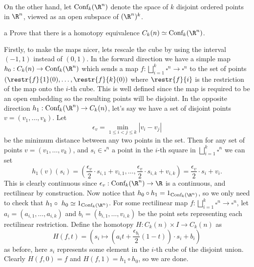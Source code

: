 \documentclass[11pt,letterpaper]{article}
\begin{document}
\begin{solution}
    \quad On the other hand, let $\text{Conf}_k(\R^n)$ denote the space of $k$ disjoint ordered points in $\R^n$, viewed as an open subspace of $(\R^n)^k$.

    \begin{partproblem}{a}
        Prove that there is a homotopy equivalence $C_k(n)\simeq \text{Conf}_k(\R^n)$.
    \end{partproblem}

    \quad Firstly, to make the maps nicer, lets rescale the cube by using the interval $(-1,1)$ instead of $(0,1)$. In the forward direction we have a simple map $h_0 : C_k(n) \to \text{Conf}_k(\R^n)$ which sends a map $f : \bigsqcup_{i=1}^k \square^n \to \square^n$ to the set of points $(\restr{f}{1}(0), \ldots, \restr{f}{k}(0))$ where $\restr{f}{i}$ is the restriction of the map onto the $i$-th cube. This is well defined since the map is required to be an open embedding so the resulting points will be disjoint. In the opposite direction $h_1 : \text{Conf}_k(\R^n) \to C_k(n)$, let's say we have a set of disjoint points $v=(v_1,\ldots,v_k)$. Let $$\epsilon_v = \min_{1\leq i< j\leq k} |v_i - v_j|$$ be the minimum distance between any two points in the set. Then for any set of points $v=(v_1, \ldots, v_k)$, and $s_i\in \square^n$ a point in the $i$-th square in $\bigsqcup^k_{i=1}\square^n$ we can set
    \[
        h_1(v)(s_i) = \left(\frac{\epsilon_v}{2}\cdot s_{i,1} + v_{i,1}, \ldots, \frac{\epsilon_v}{2}\cdot s_{i,k} + v_{i,k}\right) = \frac{\epsilon_v}{2}\cdot s_i + v_i
    .\]
    This is clearly continuous since $\epsilon_v : \text{Conf}_k(\R^n) \to \R$ is a continuous, and rectilinear by construction. Now notice that $h_0\circ h_1 = 1_{\text{Conf}_k(\R^n)}$, so we only need to check that $h_1\circ\ h_0 \simeq 1_{\text{Conf}_k(\R^n)}$. For some rectilinear map $f : \bigsqcup^k_{i=1}\square^n \to \square^n$, let $a_i=(a_{i,1},\ldots, a_{i,k})$ and $b_i = (b_{i,1},\ldots,v_{i,k})$ be the point sets representing each rectilinear restriction. Define the homotopy $H : C_k(n)\times I \to C_k(n)$ as
    \[
        H(f,t) = \left( s_i \mapsto \left(a_it+\frac{\epsilon_{b_i}}{2}(1-t)\right) \cdot s_i + b_i\right)
    \]    
    as before, here $s_i$ represents some element in the $i$-th cube of the disjoint union. Clearly $H(f,0)=f$ and $H(f,1)=h_1\circ h_0$, so we are done. 


\end{solution}
\end{document}
